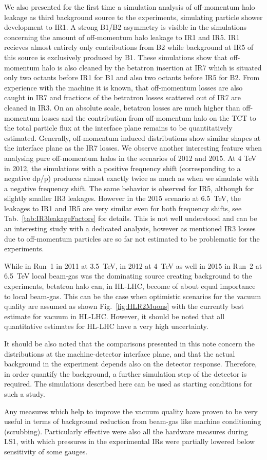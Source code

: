 We also presented for the first time a simulation analysis of off-momentum halo leakage as third background source to the experiments, simulating particle shower development to IR1. A strong B1/B2 asymmetry is visible in the simulations concerning the amount of off-momentum halo leakage to IR1 and IR5. IR1 recieves almost entirely only contributions from B2 while background at IR5 of this source is exclusively produced by B1. These simulations show that off-momentum halo is also cleaned by the betatron insertion at IR7 which is situated only two octants before IR1 for B1 and also two octants before IR5 for B2. From experience with the machine it is known, that off-momentum losses are also caught in IR7 and fractions of the betratron losses scattered out of IR7 are cleaned in IR3. On an absolute scale, betatron losses are much higher than off-momentum losses and the contribution from off-momentum halo on the TCT to the total particle flux at the interface plane remains to be quantitatively estimated.
Generally, off-momentum induced distributions show similar shapes at the interface plane as the IR7 losses. We observe another interesting feature when analysing pure off-momentum halos in the scenarios of 2012 and 2015. At 4 TeV in 2012, the simulations with a positive frequency shift (corresponding to a negative dp/p) produces almost exactly twice as much as when we simulate with a negative frequency shift. The same behavior is observed for IR5, although for slightly smaller IR3 leakages. However in the 2015 scenario at 6.5~TeV, the leakages to IR1 and IR5 are very similar even for both frequency shifts, see Tab.~\ref{tab:IR3leakageFactors} for details. This is not well understood and can be an interesting study with a dedicated analysis, however as mentioned IR3 losses due to off-momentum particles are so far not estimated to be problematic for the experiments. 


While in Run~1 in 2011 at 3.5~TeV, in 2012 at 4~TeV as well in 2015 in Run~2 at 6.5~TeV local beam-gas was the dominating source creating background to the experiments, betatron halo can, in HL-LHC, become of about equal importance to local beam-gas. This can be the case when optimistic scenarios for the vacuum quality are assumed as shown Fig.~\ref{fig:HLR2Muons} with the currently best estimate for vacuum in HL-LHC. However, it should be noted that all quantitative estimates for HL-LHC have a very high uncertainty.

It should be also noted that the comparisons presented in this note concern the distributions at the machine-detector interface plane, and that the actual background in the experiment depends also on the detector response. Therefore, in order quantify the background, a further simulation step of the detector is required. The simulations described here can be used as starting conditions for such a study.

Any measures which help to improve the vacuum quality have proven to be very useful in terms of background reduction from beam-gas like machine conditioning (scrubbing). Particularly effective were also all the hardware measures during LS1, with which pressures in the experimental IRs were partially lowered below sensitivity of some gauges.


